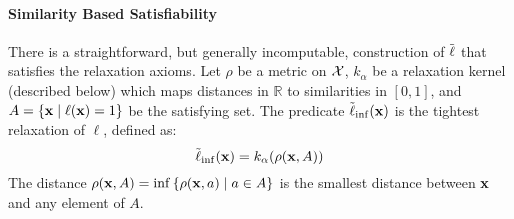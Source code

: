\paragraph{Similarity Based Satisfiability}
There is a straightforward, but generally incomputable, construction of $\tilde{\operatorname{\ell}}$ that satisfies the relaxation axioms.
Let $\rho$ be a metric on ${\mathcal{X}}$, $k_\alpha$ be a relaxation kernel (described below) which maps distances in $\mathbb{R}$ to similarities in $[0, 1]$, and $A = \{\mathbf{x} \mid \operatorname{\ell}(\mathbf{x}) = 1\}$ be the satisfying set.
The predicate $\tilde{\operatorname{\ell}}_{\inf}(\mathbf{x})$ is the tightest relaxation of $\ell$, defined as:
\begin{equation}\label{eq;linf}
\tilde{\operatorname{\ell}}_{\inf}(\mathbf{x}) = k_\alpha(\rho(\mathbf{x}, A))
\end{equation}
The distance $\rho(\mathbf{x}, A) = \inf \left\{\rho(\mathbf{x}, a) \mid a \in A\right\}$ is the smallest distance between $\mathbf{x}$ and any element of $A$.



